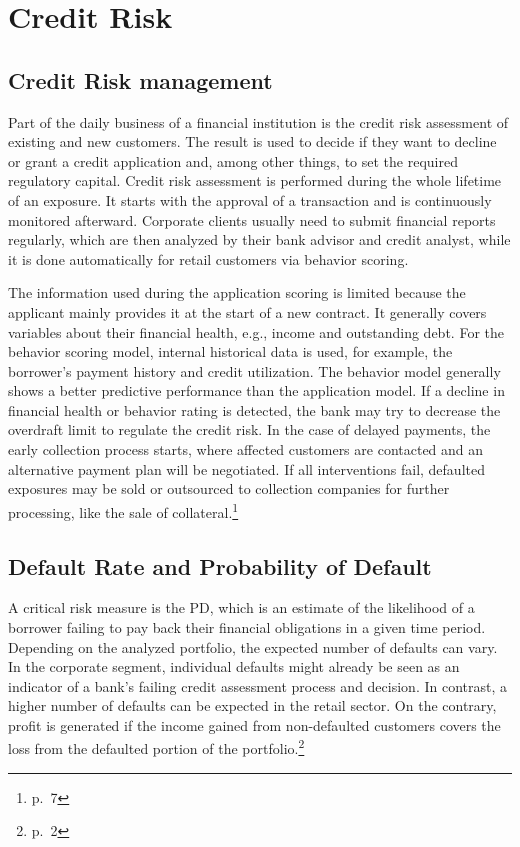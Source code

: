 \chapter{Credit Risk}
\label{ch:CR}

\section{Credit Risk management}
Part of the daily business of a financial institution is the credit risk assessment of existing and new customers. The result is used to decide if they want to decline or grant a credit application and, among other things, to set the required regulatory capital. Credit risk assessment is performed during the whole lifetime of an exposure. It starts with the approval of a transaction and is continuously monitored afterward. Corporate clients usually need to submit financial reports regularly, which are then analyzed by their bank advisor and credit analyst, while it is done automatically for retail customers via behavior scoring. 

The information used during the application scoring is limited because the applicant mainly provides it at the start of a new contract. It generally covers variables about their financial health, e.g., income and outstanding debt. For the behavior scoring model, internal historical data is used, for example, the borrower's payment history and credit utilization. The behavior model generally shows a better predictive performance than the application model. If a decline in financial health or behavior rating is detected, the bank may try to decrease the overdraft limit to regulate the credit risk. In the case of delayed payments, the early collection process starts, where affected customers are contacted and an alternative payment plan will be negotiated. If all interventions fail, defaulted exposures may be sold or outsourced to collection companies for further processing, like the sale of collateral.\footnote{\cite{Witzany:2017} p.~7}

\section{Default Rate and Probability of Default}
\label{sec:dr_pd}
A critical risk measure is the \acl{PD}, which is an estimate of the likelihood of a borrower failing to pay back their financial obligations in a given time period. Depending on the analyzed portfolio, the expected number of defaults can vary. In the corporate segment, individual defaults might already be seen as an indicator of a bank's failing credit assessment process and decision. In contrast, a higher number of defaults can be expected in the retail sector. On the contrary, profit is generated if the income gained from non-defaulted customers covers the loss from the defaulted portion of the portfolio.\footnote{\cite{Witzany:2017} p.~2}

